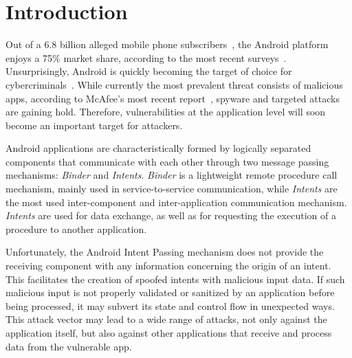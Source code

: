 \section{Introduction}

Out of a 6.8 billion alleged mobile phone subscribers~\cite{ict-facts-2013},
the Android platform enjoys a 75\% market share, according to the most recent
surveys~\cite{gartner-stats-2013,idc-android-2013}.
Unsurprisingly, Android is quickly becoming the target of choice for
cybercriminals~\cite{trendmicro-q3-2012}. While currently the
most prevalent threat consists of malicious apps, according to McAfee's most
recent report~\cite{mcafee-q1-2013}, spyware and targeted attacks
are gaining hold. Therefore, vulnerabilities at the application
level will soon become an important target for attackers.

Android applications are characteristically formed by logically separated
components that communicate with each other through two message passing mechanisms:
\emph{Binder} and \emph{Intents}. \emph{Binder} is a lightweight remote procedure call
mechanism, mainly used in service-to-service communication, while
\emph{Intents} are the most used inter-component and inter-application communication mechanism.
\emph{Intents} are used for data exchange, as well as for requesting the
execution of a procedure to another application.

Unfortunately, the Android Intent Passing mechanism does not provide the
receiving component with any information concerning the origin of an intent.
This facilitates the creation of spoofed intents with malicious input data. If such
malicious input is not properly validated or sanitized by an application
before being processed, it may subvert its state and control flow in unexpected
ways. This attack vector may lead to a wide range of attacks, not only against
the application itself, but also against other applications that receive and
process data from the vulnerable app. %


